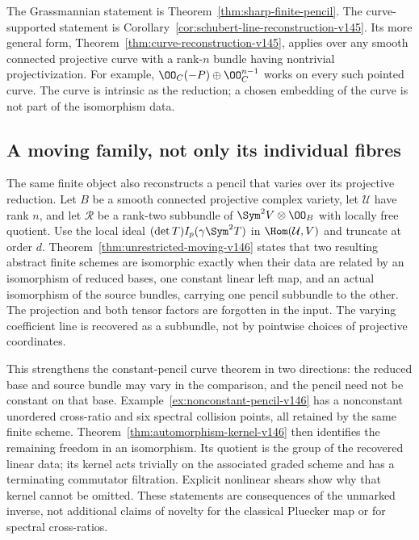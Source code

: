 The Grassmannian statement is Theorem~\ref{thm:sharp-finite-pencil}.
The curve-supported statement is
Corollary~\ref{cor:schubert-line-reconstruction-v145}.  Its more general
form, Theorem~\ref{thm:curve-reconstruction-v145}, applies over any
smooth connected projective curve with a rank-\(n\) bundle having
nontrivial projectivization.  For example,
\(\OO_C(-P)\oplus\OO_C^{n-1}\) works on every such pointed curve.
The curve is intrinsic as the reduction; a chosen embedding of the
curve is not part of the isomorphism data.

\subsection{A moving family, not only its individual fibres}
The same finite object also reconstructs a pencil that varies over its
projective reduction.  Let \(B\) be a smooth connected projective
complex variety, let \(\mathcal U\) have rank \(n\), and let \(\mathcal R\) be a rank-two subbundle of
\(\Sym^2V\otimes\OO_B\) with locally free quotient.  Use the local
ideal \((\det T)I_p(\gamma\Sym^2T)\) in
\(\Hom(\mathcal U,V)\) and truncate at order \(d\).
Theorem~\ref{thm:unrestricted-moving-v146} states that two resulting
abstract finite schemes are isomorphic exactly when their data are
related by an isomorphism of reduced bases, one constant linear left
map, and an actual isomorphism of the source bundles, carrying one
pencil subbundle to the other.  The projection and both tensor factors
are forgotten in the input.  The varying coefficient line is recovered
as a subbundle, not by pointwise choices of projective coordinates.

This strengthens the constant-pencil curve theorem in two directions:
the reduced base and source bundle may vary in the comparison, and the
pencil need not be constant on that base.  Example~\ref{ex:nonconstant-pencil-v146}
has a nonconstant unordered cross-ratio and six spectral collision
points, all retained by the same finite scheme.  Theorem~\ref{thm:automorphism-kernel-v146}
then identifies the remaining freedom in an isomorphism.  Its quotient
is the group of the recovered linear data; its kernel acts trivially
on the associated graded scheme and has a terminating commutator
filtration.  Explicit nonlinear shears show why that kernel cannot be
omitted.  These statements are consequences of the unmarked inverse,
not additional claims of novelty for the classical Pluecker map or
for spectral cross-ratios.

